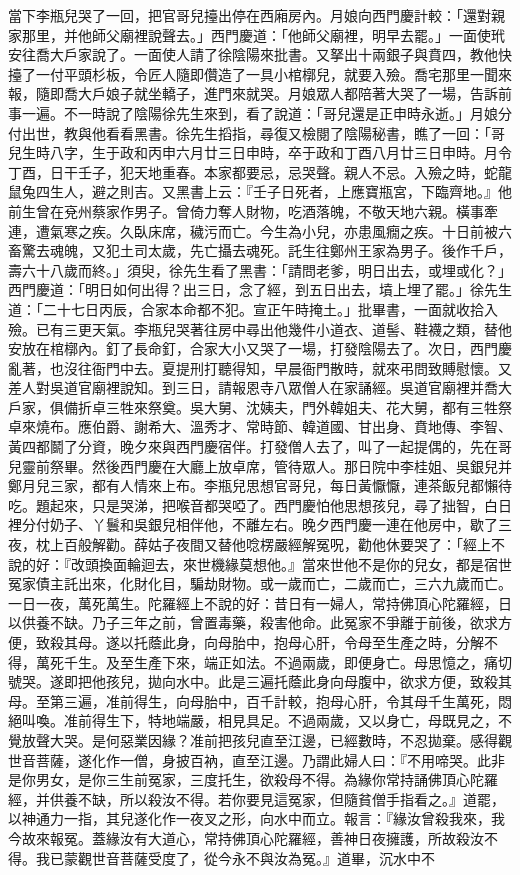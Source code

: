 \begin{showcontents}{}
當下李瓶兒哭了一回，把官哥兒擡出停在西廂房內。月娘向西門慶計較：「還對親家那里，并他師父廟裡說聲去。」西門慶道：「他師父廟裡，明早去罷。」一面使玳安往喬大戶家說了。一面使人請了徐陰陽來批書。又拏出十兩銀子與賁四，教他快擡了一付平頭杉板，令匠人隨即儹造了一具小棺槨兒，就要入殮。喬宅那里一聞來報，隨即喬大戶娘子就坐轎子，進門來就哭。月娘眾人都陪著大哭了一場，告訴前事一遍。不一時說了陰陽徐先生來到，看了說道：「哥兒還是正申時永逝。」月娘分付出世，教與他看看黑書。徐先生搯指，尋復又檢閱了陰陽秘書，瞧了一回：「哥兒生時八字，生于政和丙申六月廿三日申時，卒于政和丁酉八月廿三日申時。月令丁酉，日干壬子，犯天地重春。本家都要忌，忌哭聲。親人不忌。入殮之時，蛇龍鼠兔四生人，避之則吉。又黑書上云：『壬子日死者，上應寶瓶宮，下臨齊地。』他前生曾在兗州蔡家作男子。曾倚力奪人財物，吃酒落魄，不敬天地六親。橫事牽連，遭氣寒之疾。久臥床席，穢污而亡。今生為小兒，亦患風癇之疾。十日前被六畜驚去魂魄，又犯土司太歲，先亡攝去魂死。託生往鄭州王家為男子。後作千戶，壽六十八歲而終。」須臾，徐先生看了黑書：「請問老爹，明日出去，或埋或化？」西門慶道：「明日如何出得？出三日，念了經，到五日出去，墳上埋了罷。」徐先生道：「二十七日丙辰，合家本命都不犯。宣正午時掩土。」批畢書，一面就收拾入殮。已有三更天氣。李瓶兒哭著往房中尋出他幾件小道衣、道髻、鞋襪之類，替他安放在棺槨內。釘了長命釘，合家大小又哭了一場，打發陰陽去了。次日，西門慶亂著，也沒往衙門中去。夏提刑打聽得知，早晨衙門散時，就來弔問致賻慰懷。又差人對吳道官廟裡說知。到三日，請報恩寺八眾僧人在家誦經。吳道官廟裡并喬大戶家，俱備折卓三牲來祭奠。吳大舅、沈姨夫，門外韓姐夫、花大舅，都有三牲祭卓來燒布。應伯爵、謝希大、溫秀才、常時節、韓道國、甘出身、賁地傳、李智、黃四都鬬了分資，晚夕來與西門慶宿伴。打發僧人去了，叫了一起提偶的，先在哥兒靈前祭畢。然後西門慶在大廳上放卓席，管待眾人。那日院中李桂姐、吳銀兒并鄭月兒三家，都有人情來上布。李瓶兒思想官哥兒，每日黃懨懨，連茶飯兒都懶待吃。題起來，只是哭涕，把喉音都哭啞了。西門慶怕他思想孩兒，尋了拙智，白日裡分付奶子、丫鬟和吳銀兒相伴他，不離左右。晚夕西門慶一連在他房中，歇了三夜，枕上百般解勸。薛姑子夜間又替他唸楞嚴經解冤呪，勸他休要哭了：「經上不說的好：『改頭換面輪迴去，來世機緣莫想他。』當來世他不是你的兒女，都是宿世冤家債主託出來，化財化目，騙劫財物。或一歲而亡，二歲而亡，三六九歲而亡。一日一夜，萬死萬生。陀羅經上不說的好：昔日有一婦人，常持佛頂心陀羅經，日以供養不缺。乃子三年之前，曾置毒藥，殺害他命。此冤家不爭離于前後，欲求方便，致殺其母。遂以托蔭此身，向母胎中，抱母心肝，令母至生產之時，分解不得，萬死千生。及至生產下來，端正如法。不過兩歲，即便身亡。母思憶之，痛切號哭。遂即把他孩兒，拋向水中。此是三遍托蔭此身向母腹中，欲求方便，致殺其母。至第三遍，准前得生，向母胎中，百千計較，抱母心肝，令其母千生萬死，悶絕叫喚。准前得生下，特地端嚴，相見具足。不過兩歲，又以身亡，母既見之，不覺放聲大哭。是何惡業因緣？准前把孩兒直至江邊，已經數時，不忍拋棄。感得觀世音菩薩，遂化作一僧，身披百衲，直至江邊。乃謂此婦人曰：『不用啼哭。此非是你男女，是你三生前冤家，三度托生，欲殺母不得。為緣你常持誦佛頂心陀羅經，并供養不缺，所以殺汝不得。若你要見這冤家，但隨貧僧手指看之。』道罷，以神通力一指，其兒遂化作一夜叉之形，向水中而立。報言：『緣汝曾殺我來，我今故來報冤。蓋緣汝有大道心，常持佛頂心陀羅經，善神日夜擁護，所故殺汝不得。我已蒙觀世音菩薩受度了，從今永不與汝為冤。』道畢，沉水中不
\end{showcontents}
